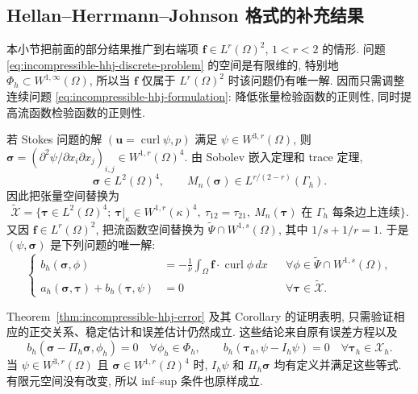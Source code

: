 \subsection{Hellan--Herrmann--Johnson 格式的补充结果}
\label{subsec:incompressible-hhj-additional-results}

本小节把前面的部分结果推广到右端项
$\mathbf f\in L^r(\Omega)^2$, $1<r<2$ 的情形.
问题 \eqref{eq:incompressible-hhj-discrete-problem} 的空间是有限维的,
特别地 $\Phi_h\subset W^{1,\infty}(\Omega)$,
所以当 $\mathbf f$ 仅属于 $L^r(\Omega)^2$ 时该问题仍有唯一解.
因而只需调整连续问题 \eqref{eq:incompressible-hhj-formulation}:
降低张量检验函数的正则性, 同时提高流函数检验函数的正则性.

若 Stokes 问题的解 $(\mathbf u=\operatorname{curl}\psi,p)$ 满足
$\psi\in W^{3,r}(\Omega)$, 则
$\boldsymbol\sigma=(\partial^2\psi/\partial x_i\partial x_j)_{i,j}
\in W^{1,r}(\Omega)^4$.
由 Sobolev 嵌入定理和 trace 定理,
\[
\boldsymbol\sigma\in L^2(\Omega)^4,
\qquad M_n(\boldsymbol\sigma)\in L^{r/(2-r)}(\Gamma_h).
\]
因此把张量空间替换为
\[
\widetilde{\mathcal X}
=\{\boldsymbol\tau\in L^2(\Omega)^4;
\ \boldsymbol\tau|_\kappa\in W^{1,r}(\kappa)^4,
\ \tau_{12}=\tau_{21},
\ M_n(\boldsymbol\tau)\text{ 在 }\Gamma_h\text{ 每条边上连续}\}.
\]
又因 $\mathbf f\in L^r(\Omega)^2$, 把流函数空间替换为
$\widetilde\Psi\cap W^{1,s}(\Omega)$, 其中 $1/s+1/r=1$.
于是 $(\psi,\boldsymbol\sigma)$ 是下列问题的唯一解:
\begin{equation}\label{eq:incompressible-hhj-low-regularity-formulation}
\left\{
\begin{aligned}
b_h(\boldsymbol\sigma,\phi)
&=-\frac1\nu\int_\Omega\mathbf f\cdot\operatorname{curl}\phi\,dx
&&\forall\phi\in\widetilde\Psi\cap W^{1,s}(\Omega),\\
a_h(\boldsymbol\sigma,\boldsymbol\tau)
+b_h(\boldsymbol\tau,\psi)&=0
&&\forall\boldsymbol\tau\in\widetilde{\mathcal X}.
\end{aligned}
\right.
\end{equation}

Theorem~\ref{thm:incompressible-hhj-error} 及其 Corollary 的证明表明,
只需验证相应的正交关系、稳定估计和误差估计仍然成立.
这些结论来自原有误差方程以及
\[
b_h(\boldsymbol\sigma-\Pi_h\boldsymbol\sigma,\phi_h)=0
\quad\forall\phi_h\in\Phi_h,
\qquad
b_h(\boldsymbol\tau_h,\psi-I_h\psi)=0
\quad\forall\boldsymbol\tau_h\in\mathcal X_h.
\]
当 $\psi\in W^{3,r}(\Omega)$ 且
$\boldsymbol\sigma\in W^{1,r}(\Omega)^4$ 时,
$I_h\psi$ 和 $\Pi_h\boldsymbol\sigma$ 均有定义并满足这些等式.
有限元空间没有改变, 所以 inf--sup 条件也原样成立.

